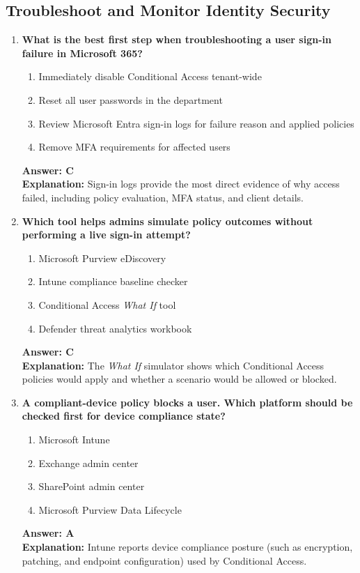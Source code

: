 \documentclass[10pt]{article}
\begin{document}
\subsection{Troubleshoot and Monitor Identity Security}
\begin{enumerate}[leftmargin=*]

\item \textbf{What is the best first step when troubleshooting a user sign-in failure in Microsoft 365?}
\begin{enumerate}[label=\Alph*.]
  \item Immediately disable Conditional Access tenant-wide
  \item Reset all user passwords in the department
  \item Review Microsoft Entra sign-in logs for failure reason and applied policies
  \item Remove MFA requirements for affected users
\end{enumerate}
\textbf{Answer: C}\\
\textbf{Explanation:} Sign-in logs provide the most direct evidence of why access failed, including policy evaluation, MFA status, and client details.

\item \textbf{Which tool helps admins simulate policy outcomes without performing a live sign-in attempt?}
\begin{enumerate}[label=\Alph*.]
  \item Microsoft Purview eDiscovery
  \item Intune compliance baseline checker
  \item Conditional Access \textit{What If} tool
  \item Defender threat analytics workbook
\end{enumerate}
\textbf{Answer: C}\\
\textbf{Explanation:} The \textit{What If} simulator shows which Conditional Access policies would apply and whether a scenario would be allowed or blocked.

\item \textbf{A compliant-device policy blocks a user. Which platform should be checked first for device compliance state?}
\begin{enumerate}[label=\Alph*.]
  \item Microsoft Intune
  \item Exchange admin center
  \item SharePoint admin center
  \item Microsoft Purview Data Lifecycle
\end{enumerate}
\textbf{Answer: A}\\
\textbf{Explanation:} Intune reports device compliance posture (such as encryption, patching, and endpoint configuration) used by Conditional Access.


\end{enumerate}
\end{document}
